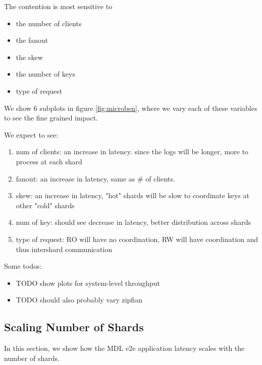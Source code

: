 The contention is most sensitive to
\begin{itemize}
    \item the number of clients 
    \item the fanout 
    \item the skew 
    \item the number of keys 
    \item type of request 
\end{itemize}

We show 6 subplots in figure \ref{fig:microben}, where we vary each of these variables to see the fine grained impact.

We expect to see:
\begin{enumerate}
    \item num of clients: an increase in latency. since the logs will be longer, more to process at each shard
    \item fanout: an increase in latency, same as \# of clients.
    \item skew: an increase in latency, "hot" shards will be slow to coordinate keys at other "cold" shards
    \item num of key: should see decrease in latency, better distribution across shards
    \item type of request: RO will have no coordination, RW will have coordination and thus intershard communication
\end{enumerate}

Some todos:
\begin{itemize}
    \item TODO show plots for system-level throughput
    \item TODO should also probably vary zipfian
\end{itemize}

\subsection{Scaling Number of Shards}
\label{sec:shards}
In this section, we show how the MDL e2e application latency scales with the number of shards. 

